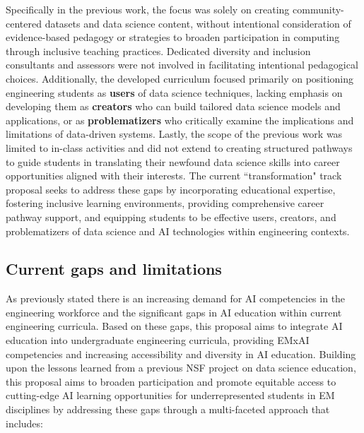 \documentclass[11pt]{article}
\begin{document}
Specifically in the previous work, the focus was solely on creating community-centered datasets and data science content, without intentional consideration of evidence-based pedagogy or strategies to broaden participation in computing through inclusive teaching practices. 
Dedicated diversity and inclusion consultants and assessors were not involved in facilitating intentional pedagogical choices.
Additionally, the developed curriculum focused primarily on positioning engineering students as \textbf{users} of data science techniques, lacking emphasis on developing them as \textbf{creators} who can build tailored data science models and applications, or as \textbf{problematizers} who critically examine the implications and limitations of data-driven systems.
Lastly, the scope of the previous work was limited to in-class activities and did not extend to creating structured pathways to guide students in translating their newfound data science skills into career opportunities aligned with their interests.
The current ``transformation" track proposal seeks to address these gaps by incorporating educational expertise, fostering inclusive learning environments, providing comprehensive career pathway support, and equipping students to be effective users, creators, and problematizers of data science and AI technologies within engineering contexts.

\subsection{Current gaps and limitations}




As previously stated there is an increasing demand for AI competencies in the engineering workforce and the significant gaps in AI education within current engineering curricula. 
Based on these gaps, this proposal aims to integrate AI education into undergraduate engineering curricula, providing EMxAI competencies and increasing accessibility and diversity in AI education.
Building upon the lessons learned from a previous NSF project on data science education, this proposal aims to broaden participation and promote equitable access to cutting-edge AI learning opportunities for underrepresented students in EM disciplines by addressing these gaps through a multi-faceted approach that includes:
\end{document}
